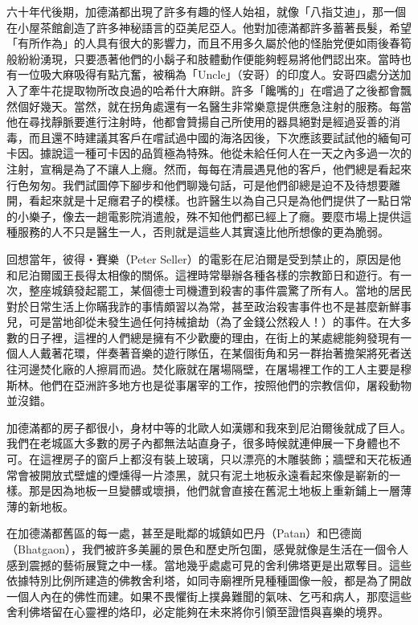 
六十年代後期，加德滿都出現了許多有趣的怪人始祖，就像「八指艾迪」，那一個在小屋茶館創造了許多神秘語言的亞美尼亞人。他對加德滿都許多蓄著長髮，希望「有所作為」的人具有很大的影響力，而且不用多久屬於他的怪胎党便如雨後春筍般紛紛湧現，只要憑著他們的小鬍子和肢體動作便能夠輕易將他們認出來。當時也有一位吸大麻吸得有點亢奮，被稱為「Uncle」（安哥）的印度人。安哥四處分送加入了牽牛花提取物所改良過的哈希什大麻餅。許多「饞嘴的」在嚐過了之後都會飄然個好幾天。當然，就在拐角處還有一名醫生非常樂意提供應急注射的服務。每當他在尋找靜脈要進行注射時，他都會贊揚自己所使用的器具絕對是經過妥善的消毒，而且還不時建議其客戶在嚐試過中國的海洛因後，下次應該要試試他的緬甸可卡因。據說這一種可卡因的品質極為特殊。他從未給任何人在一天之內多過一次的注射，宣稱是為了不讓人上癮。然而，每每在清晨遇見他的客戶，他們總是看起來行色匆匆。我們試圖停下腳步和他們聊幾句話，可是他們卻總是迫不及待想要離開，看起來就是十足癮君子的模樣。也許醫生以為自己只是為他們提供了一點日常的小樂子，像去一趟電影院消遣般，殊不知他們都已經上了癮。要麼市場上提供這種服務的人不只是醫生一人，否則就是這些人其實遠比他所想像的更為脆弱。

回想當年，彼得‧賽樂（Peter
Seller）的電影在尼泊爾是受到禁止的，原因是他和尼泊爾國王長得太相像的關係。這裡時常舉辦各種各樣的宗教節日和遊行。有一次，整座城鎮發起罷工，某個德士司機遭到殺害的事件震驚了所有人。當地的居民對於日常生活上你瞞我詐的事情頗習以為常，甚至政治殺害事件也不是甚麼新鮮事兒，可是當地卻從未發生過任何持械搶劫（為了金錢公然殺人！）的事件。在大多數的日子裡，這裡的人們總是擁有不少歡慶的理由，在街上的某處總能夠發現有一個人人戴著花環，伴奏著音樂的遊行隊伍，在某個街角和另一群抬著擔架將死者送往河邊焚化廠的人擦肩而過。焚化廠就在屠場隔壁，在屠場裡工作的工人主要是穆斯林。他們在亞洲許多地方也是從事屠宰的工作，按照他們的宗教信仰，屠殺動物並沒錯。

加德滿都的房子都很小，身材中等的北歐人如漢娜和我來到尼泊爾後就成了巨人。我們在老城區大多數的房子內都無法站直身子，很多時候就連伸展一下身體也不可。在這裡房子的窗戶上都沒有裝上玻璃，只以漂亮的木雕裝飾；牆壁和天花板通常會被開放式壁爐的煙燻得一片漆黑，就只有泥土地板永遠看起來像是嶄新的一樣。那是因為地板一旦變髒或壞損，他們就會直接在舊泥土地板上重新鋪上一層薄薄的新地板。

在加德滿都舊區的每一處，甚至是毗鄰的城鎮如巴丹（Patan）和巴德崗（Bhatgaon），我們被許多美麗的景色和歷史所包圍，感覺就像是生活在一個令人感到震撼的藝術展覽之中一樣。當地幾乎處處可見的舍利佛塔更是出眾奪目。這些依據特別比例所建造的佛教舍利塔，如同寺廟裡所見種種圖像一般，都是為了開啟一個人內在的佛性而建。如果不畏懼街上撲鼻難聞的氣味、乞丐和病人，那麼這些舍利佛塔留在心靈裡的烙印，必定能夠在未來將你引領至證悟與喜樂的境界。

